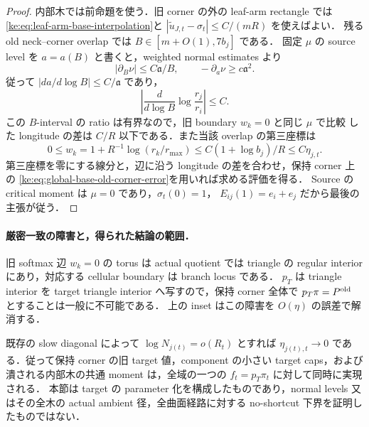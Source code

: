 \begin{proof}
内部木では前命題を使う．旧 corner の外の leaf-arm rectangle では
\eqref{ke:eq:leaf-arm-base-interpolation}と
$|\widetilde u_{J,t}-\sigma_t|\le C/(mR)$ を使えばよい．
残る old neck--corner overlap では $B\in[m+O(1),7b_j]$ である．
固定 $\mu$ の source level を $a=a(B)$ と書くと，weighted normal estimates より
\[
 |\partial_B\nu|\le C\mathfrak a/B,
 \qquad -\partial_a\nu\ge c\mathfrak a^2.
\]
従って $|da/d\log B|\le C/\mathfrak a$ であり，
\[
 \left|\frac{d}{d\log B}\log\frac{r_j}{r_i}\right|\le C.
\]
この $B$-interval の ratio は有界なので，旧 boundary $w_k=0$ と同じ $\mu$ で比較
した longitude の差は $C/R$ 以下である．また当該 overlap の第三座標は
\[
 0\le w_k=1+R^{-1}\log(r_k/r_{\max})
 \le C(1+\log b_j)/R\le C\eta_{j,t}.
\]
第三座標を零にする線分と，辺に沿う longitude の差を合わせ，保持 corner 上の
\eqref{ke:eq:global-base-old-corner-error}を用いれば求める評価を得る．
Source の critical moment は $\mu=0$ であり，$\sigma_t(0)=1$，
$E_{ij}(1)=e_i+e_j$ だから最後の主張が従う．
\end{proof}

\paragraph{厳密一致の障害と，得られた結論の範囲．}
旧 softmax 辺 $w_k=0$ の torus は actual quotient では triangle の regular
interior にあり，対応する cellular boundary は branch locus である．
$p_T$ は triangle interior を target triangle interior へ写すので，保持 corner
全体で $p_T\pi=P^{\rm old}$ とすることは一般に不可能である．
上の inset はこの障害を $O(\eta)$ の誤差で解消する．

既存の slow diagonal によって $\log N_{j(t)}=o(R_t)$ とすれば
$\eta_{j(t),t}\to0$ である．従って保持 corner の旧 target 値，component の小さい
target caps，および潰される内部木の共通 moment は，全域の一つの
$f_t=p_T\pi_t$ に対して同時に実現される．
本節は target の parameter 化を構成したものであり，normal levels 又はその全木の
actual ambient 径，全曲面経路に対する no-shortcut 下界を証明したものではない．
